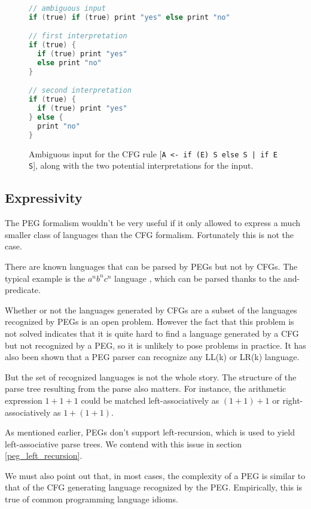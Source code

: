 \begin{figure}[here]
\small
\begin{lstlisting}[frame=single,language=C]
// ambiguous input
if (true) if (true) print "yes" else print "no"

// first interpretation
if (true) {
  if (true) print "yes"
  else print "no"
}

// second interpretation
if (true) {
  if (true) print "yes"
} else {
  print "no"
}
\end{lstlisting}
\caption{Ambiguous input for the CFG rule [\texttt{A <- if (E) S else S | if E
    S}], along with the two potential interpretations for the input.}
\label{dangling_else}
\end{figure}

\subsection{Expressivity}
\label{cfg_peg_expressivity}

The PEG formalism wouldn't be very useful if it only allowed to express a much
smaller class of languages than the CFG formalism. Fortunately this is not the
case.

There are known languages that can be parsed by PEGs but not by CFGs. The
typical example is the $a^n b^n c^n$ language \cite{ford2002thesis}, which can
be parsed thanks to the and-predicate.

Whether or not the languages generated by CFGs are a subset of the languages
recognized by PEGs is an open problem. However the fact that this problem is not
solved indicates that it is quite hard to find a language generated by a CFG but
not recognized by a PEG, so it is unlikely to pose problems in practice. It has
also been shown \cite{ford2002thesis} that a PEG parser can recognize any LL(k)
or LR(k) language.

But the set of recognized languages is not the whole story. The structure of the
parse tree resulting from the parse also matters. For instance, the arithmetic
expression $1 + 1 + 1$ could be matched left-associatively as $(1 + 1) + 1$ or
right-associatively as $1 + (1 + 1)$.

As mentioned earlier, PEGs don't support left-recursion, which is used to yield
left-associative parse trees. We contend with this issue in section
\ref{peg_left_recursion}.

We must also point out that, in most cases, the complexity of a PEG is similar
to that of the CFG generating language recognized by the PEG. Empirically, this
is true of common programming language idioms.

